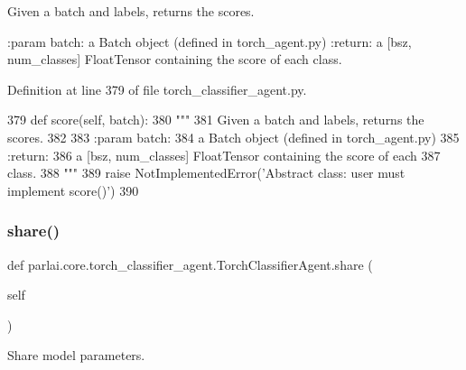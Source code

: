 \begin{DoxyVerb}Given a batch and labels, returns the scores.

:param batch:
    a Batch object (defined in torch_agent.py)
:return:
    a [bsz, num_classes] FloatTensor containing the score of each
    class.
\end{DoxyVerb}
 

Definition at line 379 of file torch\+\_\+classifier\+\_\+agent.\+py.


\begin{DoxyCode}
379     \textcolor{keyword}{def }score(self, batch):
380         \textcolor{stringliteral}{"""}
381 \textcolor{stringliteral}{        Given a batch and labels, returns the scores.}
382 \textcolor{stringliteral}{}
383 \textcolor{stringliteral}{        :param batch:}
384 \textcolor{stringliteral}{            a Batch object (defined in torch\_agent.py)}
385 \textcolor{stringliteral}{        :return:}
386 \textcolor{stringliteral}{            a [bsz, num\_classes] FloatTensor containing the score of each}
387 \textcolor{stringliteral}{            class.}
388 \textcolor{stringliteral}{        """}
389         \textcolor{keywordflow}{raise} NotImplementedError(\textcolor{stringliteral}{'Abstract class: user must implement score()'})
390 \end{DoxyCode}
\mbox{\label{classparlai_1_1core_1_1torch__classifier__agent_1_1TorchClassifierAgent_a33e56566ee5e81b257b049bd6a3c1cd6}} 
\subsubsection{\texorpdfstring{share()}{share()}}
{\footnotesize\ttfamily def parlai.\+core.\+torch\+\_\+classifier\+\_\+agent.\+Torch\+Classifier\+Agent.\+share (\begin{DoxyParamCaption}\item[{}]{self }\end{DoxyParamCaption})}

\begin{DoxyVerb}Share model parameters.
\end{DoxyVerb}
 

